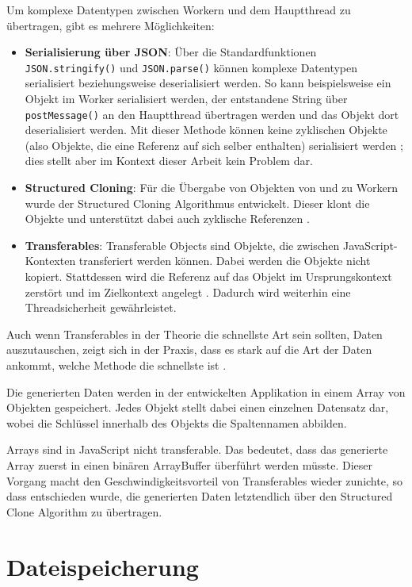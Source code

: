 Um komplexe Datentypen zwischen Workern und dem Hauptthread zu übertragen, gibt es mehrere Möglichkeiten:
\begin{itemize}
    \item \textbf{Serialisierung über JSON}: Über die Standardfunktionen \texttt{JSON.stringify()} und \texttt{JSON.parse()} können komplexe Datentypen serialisiert beziehungsweise deserialisiert werden. So kann beispielsweise ein Objekt im Worker serialisiert werden, der entstandene String über \texttt{postMessage()} an den Hauptthread übertragen werden und das Objekt dort deserialisiert werden. Mit dieser Methode können keine zyklischen Objekte (also Objekte, die eine Referenz auf sich selber enthalten) serialisiert werden \cite{mdn:json_stringify}; dies stellt aber im Kontext dieser Arbeit kein Problem dar.
    \item \textbf{Structured Cloning}: Für die Übergabe von Objekten von und zu Workern wurde der Structured Cloning Algorithmus entwickelt. Dieser klont die Objekte und unterstützt dabei auch zyklische Referenzen \cite{mdn:structured_cloning}.
    \item \textbf{Transferables}: Transferable Objects sind Objekte, die zwischen JavaScript-Kon\-texten transferiert werden können. Dabei werden die Objekte nicht kopiert. Stattdessen wird die Referenz auf das Objekt im Ursprungskontext zerstört und im Zielkontext angelegt \cite{googledev:transferables}. Dadurch wird weiterhin eine Threadsicherheit gewährleistet.
\end{itemize}

Auch wenn Transferables in der Theorie die schnellste Art sein sollten, Daten auszutauschen, zeigt sich in der Praxis, dass es stark auf die Art der Daten ankommt, welche Methode die schnellste ist \cite{transferables1, transferables2, transferables3}.

Die generierten Daten werden in der entwickelten Applikation in einem Array von Objekten gespeichert. Jedes Objekt stellt dabei einen einzelnen Datensatz dar, wobei die Schlüssel innerhalb des Objekts die Spaltennamen abbilden.

Arrays sind in JavaScript nicht transferable. Das bedeutet, dass das generierte Array zuerst in einen binären ArrayBuffer überführt werden müsste. Dieser Vorgang macht den Geschwindigkeitsvorteil von Transferables wieder zunichte, so dass entschieden wurde, die generierten Daten letztendlich über den Structured Clone Algorithm zu übertragen.

\section{Dateispeicherung}

